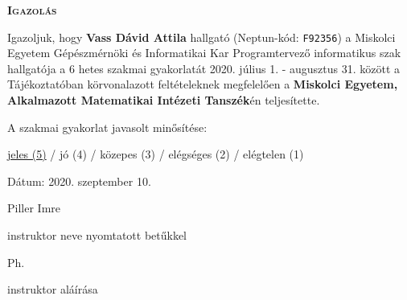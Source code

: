 \documentclass[a4paper, 14pt]{extarticle}
\begin{document}

%
\pagestyle{empty}

\begin{center}
\textbf{\textsc{Igazolás}}
\end{center}

\vskip 1cm

\noindent Igazoljuk, hogy \textbf{Vass Dávid Attila} hallgató (Neptun-kód: \texttt{F92356})
a Miskolci Egyetem Gépészmérnöki és Informatikai Kar Programtervező informatikus szak hallgatója a 6 hetes szakmai gyakorlatát
2020. július 1. - augusztus 31. között a Tájékoztatóban körvonalazott feltételeknek megfelelően a \textbf{Miskolci Egyetem, Alkalmazott Matematikai Intézeti Tanszék}én teljesítette.

\vskip 1cm

\noindent A szakmai gyakorlat javasolt minősítése:

\noindent \underline{jeles (5)} / jó (4) / közepes (3) / elégséges (2) / elégtelen (1)

\vskip 2cm

\noindent Dátum: 2020. szeptember 10.

\vskip 1cm

\hskip 10cm Piller Imre

\hskip 7cm instruktor neve nyomtatott betűkkel

\vskip 1cm

\hskip 2cm Ph.

\vskip 1cm

\hskip 9cm instruktor aláírása
\end{document}
